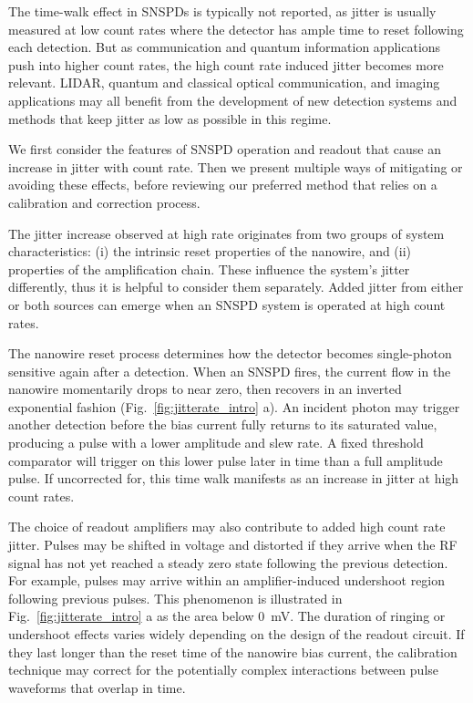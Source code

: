 \documentclass[11pt]{caltech_thesis} %
\begin{document}
The time-walk effect in SNSPDs is typically not reported, as jitter is usually measured at low count rates where the detector has ample time to reset following each detection. But as communication and quantum information applications push into higher count rates, the high count rate induced jitter becomes more relevant. LIDAR, quantum and classical optical communication, and imaging applications may all benefit from the development of new detection systems and methods that keep jitter as low as possible in this regime.

We first consider the features of SNSPD operation and readout that cause an increase in jitter with count rate. Then we present multiple ways of mitigating or avoiding these effects, before reviewing our preferred method that relies on a calibration and correction process.

The jitter increase observed at high rate originates from two groups of system characteristics: (i) the intrinsic reset properties of the nanowire, and (ii) properties of the amplification chain. These influence the system's jitter differently, thus it is helpful to consider them separately. Added jitter from either or both sources can emerge when an SNSPD system is operated at high count rates.

The nanowire reset process determines how the detector becomes single-photon sensitive again after a detection. When an SNSPD fires, the current flow in the nanowire momentarily drops to near zero, then recovers in an inverted exponential fashion (Fig.~\ref{fig:jitterate_intro} a). An incident photon may trigger another detection before the bias current fully returns to its saturated value, producing a pulse with a lower amplitude and slew rate. A fixed threshold comparator will trigger on this lower pulse later in time than a full amplitude pulse. If uncorrected for, this time walk manifests as an increase in jitter at high count rates.

The choice of readout amplifiers may also contribute to added high count rate jitter. Pulses may be shifted in voltage and distorted if they arrive when the RF signal has not yet reached a steady zero state following the previous detection. For example, pulses may arrive within an amplifier-induced undershoot region following previous pulses. This phenomenon is illustrated in Fig.~\ref{fig:jitterate_intro} a as the area below 0~mV. The duration of ringing or undershoot effects varies widely depending on the design of the readout circuit. If they last longer than the reset time of the nanowire bias current, the calibration technique may correct for the potentially complex interactions between pulse waveforms that overlap in time.
\end{document}
